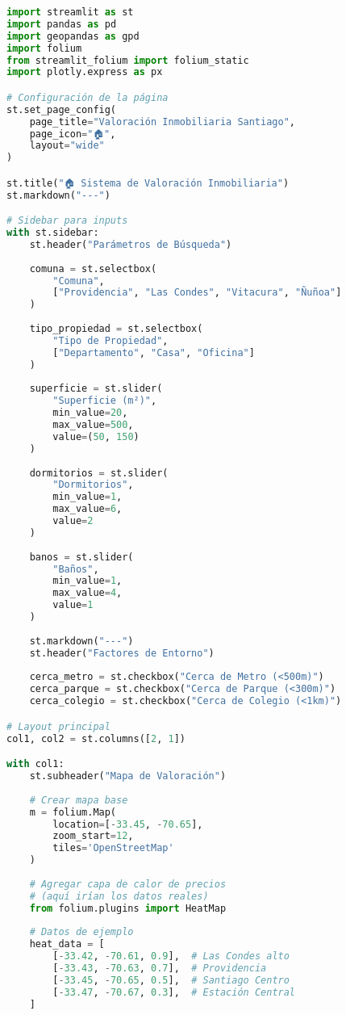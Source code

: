 \documentclass[11pt,a4paper]{article}
\begin{document}
\begin{lstlisting}[language=Python]
import streamlit as st
import pandas as pd
import geopandas as gpd
import folium
from streamlit_folium import folium_static
import plotly.express as px

# Configuración de la página
st.set_page_config(
    page_title="Valoración Inmobiliaria Santiago",
    page_icon="🏠",
    layout="wide"
)

st.title("🏠 Sistema de Valoración Inmobiliaria")
st.markdown("---")

# Sidebar para inputs
with st.sidebar:
    st.header("Parámetros de Búsqueda")
    
    comuna = st.selectbox(
        "Comuna",
        ["Providencia", "Las Condes", "Vitacura", "Ñuñoa"]
    )
    
    tipo_propiedad = st.selectbox(
        "Tipo de Propiedad",
        ["Departamento", "Casa", "Oficina"]
    )
    
    superficie = st.slider(
        "Superficie (m²)",
        min_value=20,
        max_value=500,
        value=(50, 150)
    )
    
    dormitorios = st.slider(
        "Dormitorios",
        min_value=1,
        max_value=6,
        value=2
    )
    
    banos = st.slider(
        "Baños",
        min_value=1,
        max_value=4,
        value=1
    )
    
    st.markdown("---")
    st.header("Factores de Entorno")
    
    cerca_metro = st.checkbox("Cerca de Metro (<500m)")
    cerca_parque = st.checkbox("Cerca de Parque (<300m)")
    cerca_colegio = st.checkbox("Cerca de Colegio (<1km)")

# Layout principal
col1, col2 = st.columns([2, 1])

with col1:
    st.subheader("Mapa de Valoración")
    
    # Crear mapa base
    m = folium.Map(
        location=[-33.45, -70.65],
        zoom_start=12,
        tiles='OpenStreetMap'
    )
    
    # Agregar capa de calor de precios
    # (aquí irían los datos reales)
    from folium.plugins import HeatMap
    
    # Datos de ejemplo
    heat_data = [
        [-33.42, -70.61, 0.9],  # Las Condes alto
        [-33.43, -70.63, 0.7],  # Providencia
        [-33.45, -70.65, 0.5],  # Santiago Centro
        [-33.47, -70.67, 0.3],  # Estación Central
    ]
    

\end{lstlisting}
\end{document}
